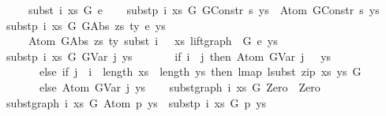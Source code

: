 \begin{isabellebody}
\ \ \ \ \ {\isacharparenleft}{\kern0pt}subst\ i\ xs\ G\ e{}{\isacharparenright}{\kern0pt}{\isachardoublequoteclose}\isanewline
\isanewline
\ \ \isanewline
{\isacharbar}{\kern0pt}\ {\isachardoublequoteopen}subst{\isacharunderscore}{\kern0pt}p\ i\ xs\ G\ {\isacharparenleft}{\kern0pt}GConstr\ s{\isacharparenright}{\kern0pt}\ ys\ {\isacharequal}{\kern0pt}\ Atom\ {\isacharparenleft}{\kern0pt}GConstr\ s{\isacharparenright}{\kern0pt}\ ys{\isachardoublequoteclose}\isanewline
{\isacharbar}{\kern0pt}\ {\isachardoublequoteopen}subst{\isacharunderscore}{\kern0pt}p\ i\ xs\ G\ {\isacharparenleft}{\kern0pt}GAbs\ zs\ ty\ e{}{\isacharparenright}{\kern0pt}\ ys\ {\isacharequal}{\kern0pt}\isanewline
\ \ \ \ \ Atom\ {\isacharparenleft}{\kern0pt}GAbs\ zs\ ty\ {\isacharparenleft}{\kern0pt}subst\ {\isacharparenleft}{\kern0pt}i\ {\isacharplus}{\kern0pt}\ {}{\isacharparenright}{\kern0pt}\ xs\ {\isacharparenleft}{\kern0pt}lift{\isacharunderscore}{\kern0pt}graph\ {}\ G{\isacharparenright}{\kern0pt}\ e{}{\isacharparenright}{\kern0pt}{\isacharparenright}{\kern0pt}\ ys{\isachardoublequoteclose}\isanewline
{\isacharbar}{\kern0pt}\ {\isachardoublequoteopen}subst{\isacharunderscore}{\kern0pt}p\ i\ xs\ G\ {\isacharparenleft}{\kern0pt}GVar\ j{\isacharparenright}{\kern0pt}\ ys\ {\isacharequal}{\kern0pt}\isanewline
\ \ \ \ \ \ {\isacharparenleft}{\kern0pt}if\ i\ {\isacharless}{\kern0pt}\ j\ then\ {\isacharparenleft}{\kern0pt}Atom\ {\isacharparenleft}{\kern0pt}GVar\ {\isacharparenleft}{\kern0pt}j\ {\isacharminus}{\kern0pt}\ {}{\isacharparenright}{\kern0pt}{\isacharparenright}{\kern0pt}\ ys{\isacharparenright}{\kern0pt}\isanewline
\ \ \ \ \ \ \ else\ if\ j\ {\isacharequal}{\kern0pt}\ i\ {\isasymand}\ length\ xs\ {\isacharequal}{\kern0pt}\ length\ ys\ then\ lmap\ {\isacharparenleft}{\kern0pt}lsubst\ {\isacharparenleft}{\kern0pt}zip\ xs\ ys{\isacharparenright}{\kern0pt}{\isacharparenright}{\kern0pt}\ G\isanewline
\ \ \ \ \ \ \ else\ {\isacharparenleft}{\kern0pt}Atom\ {\isacharparenleft}{\kern0pt}GVar\ j{\isacharparenright}{\kern0pt}\ ys{\isacharparenright}{\kern0pt}{\isacharparenright}{\kern0pt}{\isachardoublequoteclose}\isanewline
\isanewline
\ \ \isanewline
{\isacharbar}{\kern0pt}\ {\isachardoublequoteopen}subst{\isacharunderscore}{\kern0pt}graph\ i\ xs\ G\ Zero\ {\isacharequal}{\kern0pt}\ Zero{\isachardoublequoteclose}\isanewline
{\isacharbar}{\kern0pt}\ {\isachardoublequoteopen}subst{\isacharunderscore}{\kern0pt}graph\ i\ xs\ G\ {\isacharparenleft}{\kern0pt}Atom\ p\ ys{\isacharparenright}{\kern0pt}\ {\isacharequal}{\kern0pt}\ subst{\isacharunderscore}{\kern0pt}p\ i\ xs\ G\ p\ ys\ {\isachardoublequoteclose}\isanewline

\end{isabellebody}
